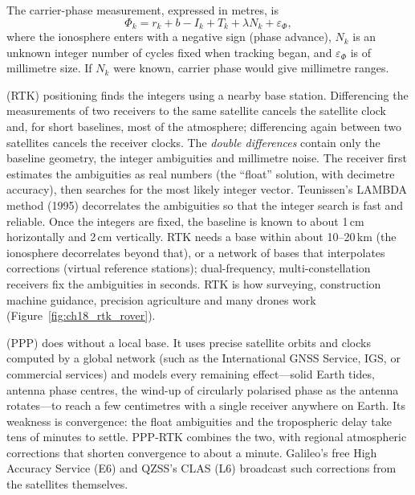 
The carrier-phase measurement, expressed in metres, is
\begin{equation}
\Phi_k=r_k+b-I_k+T_k+\lambda N_k+\varepsilon_{\Phi},
\label{eq:ch18:phase}
\end{equation}
where the ionosphere enters with a negative sign (phase advance), $N_k$ is an unknown integer
number of cycles fixed when tracking began, and $\varepsilon_\Phi$ is of millimetre size. If
$N_k$ were known, carrier phase would give millimetre ranges.

 (RTK) positioning finds the integers using a nearby base station.
Differencing the measurements of two receivers to the same satellite cancels the satellite
clock and, for short baselines, most of the atmosphere; differencing again between two
satellites cancels the receiver clocks. The \emph{double differences} contain only the
baseline geometry, the integer ambiguities and millimetre noise. The receiver first estimates
the ambiguities as real numbers (the ``float'' solution, with decimetre accuracy), then searches
for the most likely integer vector. Teunissen's LAMBDA method (1995) decorrelates the
ambiguities so that the integer search is fast and reliable. Once the integers are fixed, the
baseline is known to about 1\,cm horizontally and 2\,cm vertically. RTK needs a base within
about 10--20\,km (the ionosphere decorrelates beyond that), or a network of bases that
interpolates corrections (virtual reference stations); dual-frequency, multi-constellation
receivers fix the ambiguities in seconds. RTK is how surveying, construction machine guidance,
precision agriculture and many drones work (Figure~\ref{fig:ch18_rtk_rover}).


 (PPP) does without a local base. It uses precise satellite
orbits and clocks computed by a global network (such as the International GNSS Service, IGS, or
commercial services) and models every remaining effect---solid Earth tides, antenna phase
centres, the wind-up of circularly polarised phase as the antenna rotates---to reach a few
centimetres with a single receiver anywhere on Earth. Its weakness is convergence: the float
ambiguities and the tropospheric delay take tens of minutes to settle. PPP-RTK combines the two,
with regional atmospheric corrections that shorten convergence to about a minute. Galileo's free
High Accuracy Service (E6) and QZSS's CLAS (L6) broadcast such corrections from the satellites
themselves.

